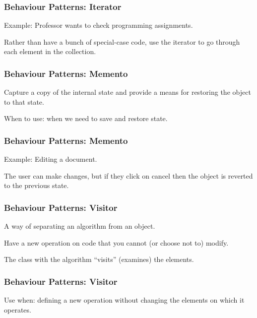 \begin{frame}
\frametitle{Behaviour Patterns: Iterator}
\begin{changemargin}{1cm}
Example: Professor wants to check programming assignments.

Rather than have a bunch of special-case code, use the iterator to go through each element in the collection.

\end{changemargin}
\end{frame}

\begin{frame}
\frametitle{Behaviour Patterns: Memento}
\begin{changemargin}{1cm}
Capture a copy of the internal state and provide a means for restoring the object to that state. 

When to use: when we need to save and restore state. 

\end{changemargin}
\end{frame}

\begin{frame}
\frametitle{Behaviour Patterns: Memento}
\begin{changemargin}{1cm}

Example: Editing a document. 

The user can make changes, but if they click on cancel then the object is reverted to the previous state. 

\end{changemargin}
\end{frame}

\begin{frame}
\frametitle{Behaviour Patterns: Visitor}
\begin{changemargin}{1cm}

A way of separating an algorithm from an object. 

Have a new operation on code that you cannot (or choose not to) modify. 

The class with the algorithm ``visits'' (examines) the elements.

\end{changemargin}
\end{frame}

\begin{frame}
\frametitle{Behaviour Patterns: Visitor}
\begin{changemargin}{1cm}

Use when: defining a new operation without changing the elements on which it operates.

\end{changemargin}
\end{frame}


